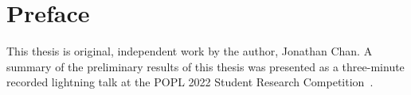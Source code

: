 \chapter{Preface}

This thesis is original, independent work by the author, Jonathan Chan.
A summary of the preliminary results of this thesis was presented
as a three-minute recorded lightning talk
at the POPL 2022 Student Research Competition~\citep{SRC}.